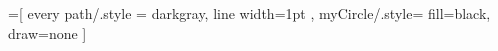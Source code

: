 \usepackage{tikz}

=[%
    every path/.style = {%
		darkgray, 
		line width=1pt
    },%
	myCircle/.style={%
		fill=black,
		draw=none
	}
]